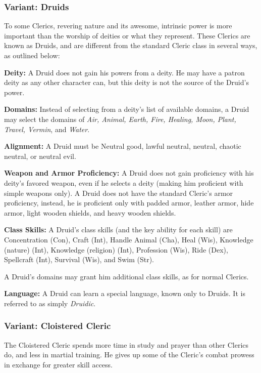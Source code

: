 \subsubsection[Druid]{Variant: Druids}
\label{sec:Druid}
To some Clerics, revering nature and its awesome, intrinsic power is more important than the worship of deities or what they represent.
These Clerics are known as Druids, and are different from the standard Cleric class in several ways, as outlined below:
\begin{list}{}{\leftmargin=1em}
 \item \textbf{Deity:} A Druid does not gain his powers from a deity. 
He may have a patron deity as any other character can, but this deity is not the source of the Druid's power.
 \item \textbf{Domains:} Instead of selecting from a deity's list of available domains, a Druid may select the domains of
 \emph{Air, Animal, Earth, Fire, Healing, Moon, Plant, Travel, Vermin}, and \emph{Water}.
 \item \textbf{Alignment:} A Druid must be Neutral good, lawful neutral, neutral, chaotic neutral, or neutral evil.
 \item \textbf{Weapon and Armor Proficiency:} A Druid does not gain proficiency with his deity's favored weapon, even if he selects a deity (making him proficient with simple weapons only). 
A Druid does not have the standard Cleric's armor proficiency, instead, he is proficient only with padded armor, leather armor, hide armor, light wooden shields, and heavy wooden shields.
 \item \textbf{Class Skills:} A Druid's class skills (and the key ability for each skill) are Concentration (Con), Craft (Int), Handle Animal (Cha), Heal (Wis), Knowledge (nature) (Int), Knowledge (religion) (Int), Profession (Wis), Ride (Dex), Spellcraft (Int), Survival (Wis), and Swim (Str).

A Druid's domains may grant him additional class skills, as for normal Clerics.
 \item \textbf{Language:} A Druid can learn a special language, known only to Druids. It is referred to as simply \emph{Druidic}.
\end{list}
\subsubsection{Variant: Cloistered Cleric}
The Cloistered Cleric spends more time in study and prayer than other Clerics do, and less in martial training. 
He gives up some of the Cleric's combat prowess in exchange for greater skill access.

